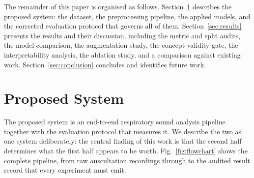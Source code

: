 \documentclass[journal,onecolumn]{IEEEtran}
\begin{document}
The remainder of this paper is organised as follows. Section~\ref{sec:proposed}
describes the proposed system: the dataset, the preprocessing pipeline, the applied
models, and the corrected evaluation protocol that governs all of them.
Section~\ref{sec:results} presents the results and their discussion, including the
metric and split audits, the model comparison, the augmentation study, the concept
validity gate, the interpretability analysis, the ablation study, and a comparison
against existing work. Section~\ref{sec:conclusion} concludes and identifies future
work.

\section{Proposed System}
\label{sec:proposed}

The proposed system is an end-to-end respiratory sound analysis pipeline together
with the evaluation protocol that measures it. We describe the two as one system
deliberately: the central finding of this work is that the second half determines
what the first half appears to be worth. Fig.~\ref{fig:flowchart} shows the complete
pipeline, from raw auscultation recordings through to the audited result record that
every experiment must emit.
\end{document}
